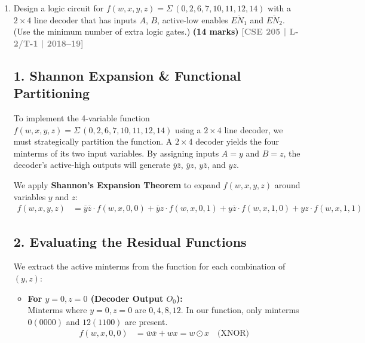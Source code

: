 \documentclass[12pt,a3paper]{article}
\newcommand{\yr}[1]{\hfill\textcolor{gray}{\small\textbf{[#1]}}}
\newcommand{\mk}[1]{\textcolor{orange!70!black}{\small\textbf{(#1 marks)}}}
\begin{document}
\begin{enumerate}
\begin{tcolorbox}[enhanced,breakable,ansbox,colback=cD!4,colframe=cD,boxrule=0.8pt,arc=5pt,title={\textbf{Answer}},fonttitle=\bfseries\color{white},colbacktitle=cD]
\begin{center}
\begin{circuitikz}[scale=0.9, transform shape, thick]
\end{circuitikz}
\end{center}

\end{tcolorbox}

\item Design a logic circuit for $f(w, x, y, z) = \Sigma\,(0, 2, 6, 7, 10, 11, 12, 14)$ with a $2\times4$ line decoder that has inputs $A$, $B$, active-low enables $\overline{EN_1}$ and $\overline{EN_2}$. (Use the minimum number of extra logic gates.)
\mk{14} \yr{CSE 205 | L-2/T-1 | 2018--19}

\begin{tcolorbox}[enhanced,breakable,ansbox,colback=cD!4,colframe=cD,boxrule=0.8pt,arc=5pt,title={\textbf{Answer}},fonttitle=\bfseries\color{white},colbacktitle=cD]

\subsection*{1. Shannon Expansion \& Functional Partitioning}
To implement the 4-variable function $f(w, x, y, z) = \Sigma\,(0, 2, 6, 7, 10, 11, 12, 14)$ using a $2 \times 4$ line decoder, we must strategically partition the function. A $2 \times 4$ decoder yields the four minterms of its two input variables. By assigning inputs $A=y$ and $B=z$, the decoder's active-high outputs will generate $\overline{y}\overline{z}$, $\overline{y}z$, $y\overline{z}$, and $yz$.

We apply \textbf{Shannon's Expansion Theorem} to expand $f(w,x,y,z)$ around variables $y$ and $z$:
\begin{align*}
    f(w,x,y,z) &= \overline{y}\overline{z} \cdot f(w,x,0,0) + \overline{y}z \cdot f(w,x,0,1) + y\overline{z} \cdot f(w,x,1,0) + yz \cdot f(w,x,1,1)
\end{align*}

\subsection*{2. Evaluating the Residual Functions}
We extract the active minterms from the function for each combination of $(y,z)$:

\begin{itemize}
    \item \textbf{For $y=0, z=0$ (Decoder Output $O_0$):}\\
    Minterms where $y=0, z=0$ are $0, 4, 8, 12$. In our function, only minterms $0 (0000)$ and $12 (1100)$ are present.
    \begin{align*}
        f(w,x,0,0) &= \overline{w}\overline{x} + wx = w \odot x \quad \text{(XNOR)}
    \end{align*}
    

\end{itemize}
\end{tcolorbox}
\end{enumerate}
\end{document}
